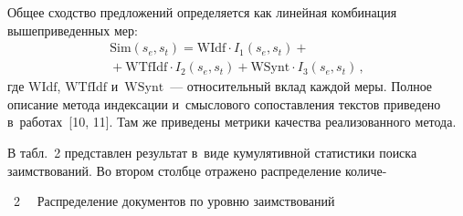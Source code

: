\begin{multicols}{2}
  Общее сходство предложений определяется как линейная комбинация 
вышеприведенных мер: 
  \begin{multline*}
  \mathrm{Sim}\left(s_e, s_t\right) =\mathrm{WIdf}\cdot
  I_1\left( s_e,s_t\right)+{}\\
  {}+\mathrm{WTfIdf}\cdot I_2\left( 
s_e,s_t\right)+\mathrm{WSynt}\cdot I_3\left( s_e, s_t\right)\,,
  \end{multline*}
    где $\mathrm{WIdf}$, $\mathrm{WTfIdf}$  и~$\mathrm{WSynt}$~--- относительный вклад 
каждой меры. Полное описание метода индексации и~смыслового 
сопоставления текстов приведено в~работах~[10, 11]. Там же приведены 
метрики качества реализованного метода.
  
  В табл.~2 представлен результат в~виде кумулятивной статистики поиска 
заимствований. Во втором столбце отражено распределение количе-\linebreak\vspace*{-12pt}

\vspace*{6pt}

\begin{center}
\noindent
\parbox{71mm}{{{\tablename~2}\ \ \small{
Распределение документов по уровню заимствований 
}}}

\vspace*{6pt}



\end{center}
\end{multicols}
